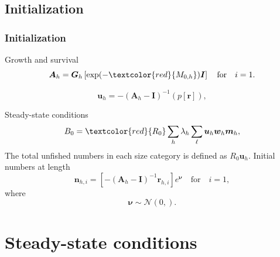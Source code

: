 \documentclass{beamer}
\begin{document}

\subsection{Initialization}
\begin{frame}
\frametitle{Initialization}
Growth and survival
\begin{equation*}
  \boldsymbol{A}_{h} = \boldsymbol{G}_h \left[ \exp (-\textcolor{red}{M_{0,h}})
    \boldsymbol{I} \right] \quad \text{for} \quad i=1.
\end{equation*}

\begin{equation*}
  \boldsymbol{u}_h = -(\boldsymbol{A}_h - \boldsymbol{I})^{-1} (p[\boldsymbol{r}]),
\end{equation*}

Steady-state conditions
\begin{equation*}
  B_0 = \textcolor{red}{R_0} \sum_h \lambda_h \sum_\ell \boldsymbol{u}_h
  \boldsymbol{w}_{h} \boldsymbol{m}_{h},
\end{equation*}
The total unfished numbers in each size category is defined as $R_0
\boldsymbol{u}_h$. Initial numbers at length
\begin{equation*}
  \boldsymbol{n}_{h,i} = \left[-\left( \boldsymbol{A}_{h} - \boldsymbol{I}
    \right)^{-1} \boldsymbol{r}_{h,i} \right] e^{\boldsymbol\nu} \quad
  \text{for} \quad i=1,
\end{equation*}
where
\begin{equation*}
  \boldsymbol\nu \sim \mathcal{N} \left( 0,  \right).
\end{equation*}
\end{frame}





\section{Steady-state conditions}

\end{document}
